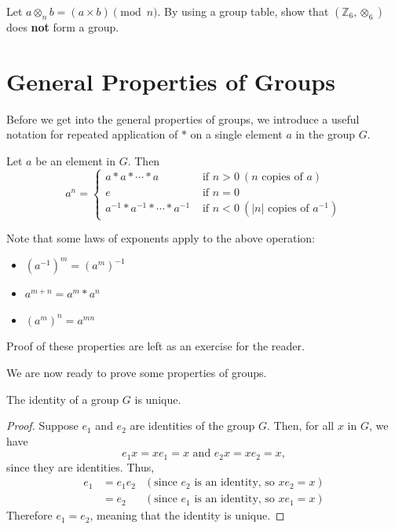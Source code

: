 \begin{exercise}
    Let $a \otimes_n b = (a \times b) \pmod{n}$. By using a group table, show that $(\mathbb{Z}_6, \otimes_6)$ does \textbf{not} form a group.
\end{exercise}

\newpage

\section{General Properties of Groups}
Before we get into the general properties of groups, we introduce a useful notation for repeated application of $\ast$ on a single element $a$ in the group $G$.
\begin{definition}
    Let $a$ be an element in $G$. Then
    \[
        a^n =
        \begin{cases}
        a\ast a\ast \cdots \ast a & \text{ if } n > 0 \ (n\text{ copies of }a)\\
        e & \text{ if } n=0 \\
        a^{-1}\ast a^{-1}\ast\cdots \ast a^{-1} & \text{ if } n<0 \ (|n|\text{ copies of }a^{-1})
        \end{cases}
    \]
\end{definition}

Note that some laws of exponents apply to the above operation:
\begin{itemize}
    \item $\left(a^{-1}\right)^m = \left(a^m\right)^{-1}$
    \item $a^{m+n} = a^m \ast a^n$
    \item $\left(a^m\right)^n = a^{mn}$
\end{itemize}
Proof of these properties are left as an exercise for the reader.

We are now ready to prove some properties of groups.
\begin{proposition}
    The identity of a group $G$ is unique.
\end{proposition}
\begin{proof}
    Suppose $e_1$ and $e_2$ are identities of the group $G$. Then, for all $x$ in $G$, we have
    \[
        e_1x = xe_1 = x \text{ and } e_2x = xe_2 = x,
    \]
    since they are identities. Thus,
    \begin{align*}
        e_1 &= e_1e_2 & (\text{since } e_2 \text{ is an identity, so } xe_2 = x)\\
        &= e_2 & (\text{since } e_1 \text{ is an identity, so } xe_1 = x)
    \end{align*}
    Therefore $e_1 = e_2$, meaning that the identity is unique.
\end{proof}

